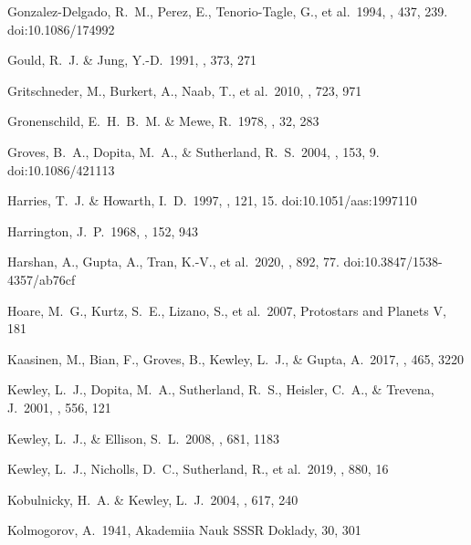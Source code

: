 \documentclass[twocolumn]{aastex62}
\begin{document}
\begin{CJK*}{UTF8}{gbsn}
\begin{thebibliography}{}
 Gonzalez-Delgado, R.~M., Perez, E., Tenorio-Tagle, G., et al.\ 1994, \apj, 437, 239. doi:10.1086/174992

 Gould, R.~J. \& Jung, Y.-D.\ 1991, \apj, 373, 271

 Gritschneder, M., Burkert, A., Naab, T., et al.\ 2010, \apj, 723, 971

 Gronenschild, E.~H.~B.~M. \& Mewe, R.\ 1978, \aaps, 32, 283

 Groves, B.~A., Dopita, M.~A., \& Sutherland, R.~S.\ 2004, \apjs, 153, 9. doi:10.1086/421113

 Harries, T.~J. \& Howarth, I.~D.\ 1997, \aaps, 121, 15. doi:10.1051/aas:1997110

 Harrington, J.~P.\ 1968, \apj, 152, 943

 Harshan, A., Gupta, A., Tran, K.-V., et al.\ 2020, \apj, 892, 77. doi:10.3847/1538-4357/ab76cf

 Hoare, M.~G., Kurtz, S.~E., Lizano, S., et al.\ 2007, Protostars and Planets V, 181

 Kaasinen, M., Bian, F., Groves, B., Kewley, L.~J., \& Gupta, A.\ 2017, \mnras, 465, 3220 


 Kewley, L.~J., Dopita, M.~A., Sutherland, R.~S., Heisler, C.~A., \& Trevena, J.\ 2001, \apj, 556, 121 

 Kewley, L.~J., \& Ellison, S.~L.\ 2008, \apj, 681, 1183 

 Kewley, L.~J., Nicholls, D.~C., Sutherland, R., et al.\ 2019, \apj, 880, 16

 Kobulnicky, H.~A. \& Kewley, L.~J.\ 2004, \apj, 617, 240

 Kolmogorov, A.\ 1941, Akademiia Nauk SSSR Doklady, 30, 301


\end{thebibliography}
\end{CJK*}
\end{document}
